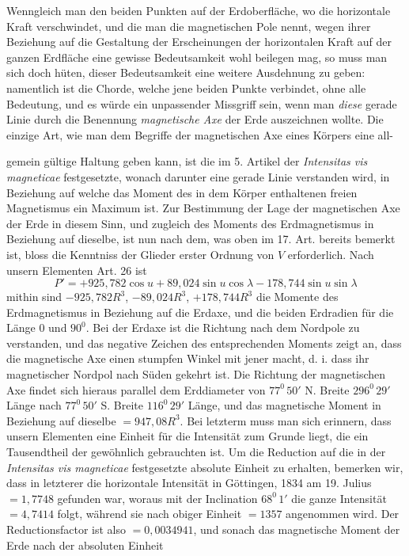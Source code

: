 Wenngleich man den beiden Punkten auf der Erdoberfläche, wo die horizontale Kraft verschwindet, und die man die magnetischen Pole nennt, wegen ihrer Beziehung auf die Gestaltung der Erscheinungen der horizontalen Kraft auf der ganzen Erdfläche eine gewisse Bedeutsamkeit wohl beilegen mag, so muss man sich doch hüten, dieser Bedeutsamkeit eine weitere Ausdehnung zu geben: namentlich ist die Chorde, welche jene beiden Punkte verbindet, ohne alle Bedeutung, und es würde ein unpassender Missgriff sein, wenn man \textit{diese} gerade Linie durch die Benennung \textit{magnetische Axe} der Erde auszeichnen wollte. Die einzige Art, wie man dem Begriffe der magnetischen Axe eines Körpers eine all-
\GaussVTheoryGathering{21\textsuperscript{*}}
\par\clearpage
{}
\noindent gemein gültige Haltung geben kann, ist die im 5. Artikel der \textit{Intensitas vis magneticae} festgesetzte, wonach darunter eine gerade Linie verstanden wird, in Beziehung auf welche das Moment des in dem Körper enthaltenen freien Magnetismus ein Maximum ist. Zur Bestimmung der Lage der magnetischen Axe der Erde in diesem Sinn, und zugleich des Moments des Erdmagnetismus in Beziehung auf dieselbe, ist nun nach dem, was oben im 17. Art. bereits bemerkt ist, bloss die Kenntniss der Glieder erster Ordnung von $V$ erforderlich. Nach unsern Elementen Art. 26 ist
\[
P'=+925{,}782\cos u+89{,}024\sin u\cos\lambda-178{,}744\sin u\sin\lambda
\]
mithin sind $-925{,}782R^3$, $-89{,}024R^3$, $+178{,}744R^3$ die Momente des Erdmagnetismus in Beziehung auf die Erdaxe, und die beiden Erdradien für die Länge $0$ und $90^0$. Bei der Erdaxe ist die Richtung nach dem Nordpole zu verstanden, und das negative Zeichen des entsprechenden Moments zeigt an, dass die magnetische Axe einen stumpfen Winkel mit jener macht, d. i. dass ihr magnetischer Nordpol nach Süden gekehrt ist. Die Richtung der magnetischen Axe findet sich hieraus parallel dem Erddiameter von $77^0\,50'$ N. Breite $296^0\,29'$ Länge nach $77^0\,50'$ S. Breite $116^0\,29'$ Länge, und das magnetische Moment in Beziehung auf dieselbe $=947{,}08R^3$. Bei letzterm muss man sich erinnern, dass unsern Elementen eine Einheit für die Intensität zum Grunde liegt, die ein Tausendtheil der gewöhnlich gebrauchten ist. Um die Reduction auf die in der \textit{Intensitas vis magneticae} festgesetzte absolute Einheit zu erhalten, bemerken wir, dass in letzterer die horizontale Intensität in Göttingen, 1834 am 19. Julius $=1{,}7748$ gefunden war, woraus mit der Inclination $68^0\,1'$ die ganze Intensität $=4{,}7414$ folgt, während sie nach obiger Einheit $=1357$ angenommen wird. Der Reductionsfactor ist also $=0{,}0034941$, und sonach das magnetische Moment der Erde nach der absoluten Einheit
